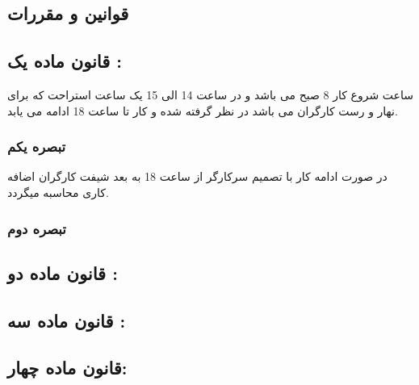 \documentclass{report}
\begin{document}
\tableofcontents	
\begin{center}
\chapter{ قوانین و مقررات}
\end{center}
\newpage
\section{ \textbf{قانون ماده یک :}}
ساعت شروع کار 8 صبح می باشد و در ساعت 14 الی 15 یک ساعت استراحت که برای نهار و رست کارگران می باشد در نظر گرفته شده و کار تا ساعت 18 ادامه می یابد.\\
\subsection{تبصره یکم}
در صورت ادامه کار با تصمیم سرکارگر از ساعت 18 به بعد شیفت کارگران اضافه کاری محاسبه میگردد.\\
\subsection{تبصره دوم}
\section{ \textbf{قانون ماده دو :}}
\section{ \textbf{قانون ماده سه :}}
\section{ \textbf{قانون ماده چهار:}}
\indent

\newpage
\latinfont	
\end{document}
